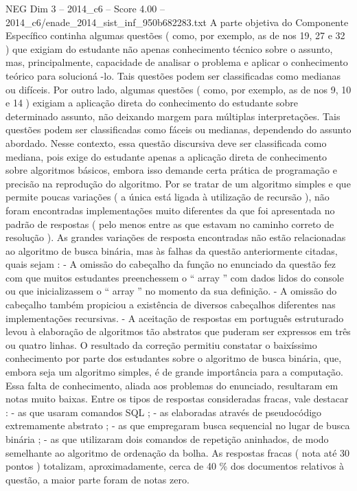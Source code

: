 \begin{textsample}{NEG Dim 3 – 2014\_c6 – Score 4.00 – 2014\_c6/enade\_2014\_sist\_inf\_950b682283.txt}
A parte objetiva do Componente Específico continha algumas questões ( como, por exemplo, as de nos 19, 27 e 32 ) que exigiam do estudante não apenas conhecimento técnico sobre o assunto, mas, principalmente, capacidade de analisar o problema e aplicar o conhecimento teórico para solucioná -lo.
Tais questões podem ser classificadas como medianas ou difíceis.
Por outro lado, algumas questões ( como, por exemplo, as de nos 9, 10 e 14 ) exigiam a aplicação direta do conhecimento do estudante sobre determinado assunto, não deixando margem para múltiplas interpretações.
Tais questões podem ser classificadas como fáceis ou medianas, dependendo do assunto abordado.
Nesse contexto, essa questão discursiva deve ser classificada como mediana, pois exige do estudante apenas a aplicação direta de conhecimento sobre algoritmos básicos, embora isso demande certa prática de programação e precisão na reprodução do algoritmo.
Por se tratar de um algoritmo simples e que permite poucas variações ( a única está ligada à utilização de recursão ), não foram encontradas implementações muito diferentes da que foi apresentada no padrão de respostas ( pelo menos entre as que estavam no caminho correto de resolução ).
As grandes variações de resposta encontradas não estão relacionadas ao algoritmo de busca binária, mas às falhas da questão anteriormente citadas, quais sejam : - A omissão do cabeçalho da função no enunciado da questão fez com que muitos estudantes preenchessem o “ array ” com dados lidos do console ou que inicializassem o “ array ” no momento da sua definição. - A omissão do cabeçalho também propiciou a existência de diversos cabeçalhos diferentes nas implementações recursivas. - A aceitação de respostas em português estruturado levou à elaboração de algoritmos tão abstratos que puderam ser expressos em três ou quatro linhas.
O resultado da correção permitiu constatar o baixíssimo conhecimento por parte dos estudantes sobre o algoritmo de busca binária, que, embora seja um algoritmo simples, é de grande importância para a computação.
Essa falta de conhecimento, aliada aos problemas do enunciado, resultaram em notas muito baixas.
Entre os tipos de respostas consideradas fracas, vale destacar : - as que usaram comandos SQL ; - as elaboradas através de pseudocódigo extremamente abstrato ; - as que empregaram busca sequencial no lugar de busca binária ; - as que utilizaram dois comandos de repetição aninhados, de modo semelhante ao algoritmo de ordenação da bolha.
As respostas fracas ( nota até 30 pontos ) totalizam, aproximadamente, cerca de 40 \% dos documentos relativos à questão, a maior parte foram de notas zero.

\end{textsample}
